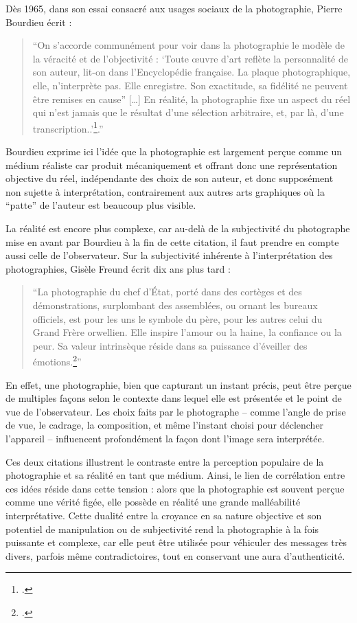 Dès 1965, dans son essai consacré aux usages sociaux de la photographie, Pierre Bourdieu écrit :
\begin{quotation}
	\enquote{On s’accorde communément pour voir dans la photographie le modèle de la véracité et de l’objectivité : \enquote{Toute \oe{}uvre d’art reflète la personnalité de son auteur, lit-on dans l’Encyclopédie française. La plaque photographique, elle, n’interprète pas. Elle enregistre. Son exactitude, sa fidélité ne peuvent être remises en cause” […] En réalité, la photographie fixe un aspect du réel qui n’est jamais que le résultat d’une sélection arbitraire, et, par là, d’une transcription..}\footcite[p.108]{bourdieuArtMoyenEssai1965}.}
\end{quotation}

Bourdieu exprime ici l'idée que la photographie est largement perçue comme un médium réaliste car produit mécaniquement et offrant donc une représentation objective du réel, indépendante des choix de son auteur, et donc supposément non sujette à interprétation, contrairement aux autres arts graphiques où la \enquote{patte} de l’auteur est beaucoup plus visible. 

La réalité est encore plus complexe, car au-delà de la subjectivité du photographe mise en avant par Bourdieu à la fin de cette citation, il faut prendre en compte aussi celle de l’observateur. Sur la subjectivité inhérente à l'interprétation des photographies, Gisèle Freund écrit dix ans plus tard :

\begin{quotation}
	\enquote{La photographie du chef d'État, porté dans des cortèges et des démonstrations, surplombant des assemblées, ou ornant les bureaux officiels, est pour les uns le symbole du père, pour les autres celui du Grand Frère orwellien. Elle inspire l'amour ou la haine, la confiance ou la peur. Sa valeur intrinsèque réside dans sa puissance d'éveiller des émotions.\footcite[p.205]{freundPhotographieSociete2006}}
\end{quotation}

En effet, une photographie, bien que capturant un instant précis, peut être perçue de multiples façons selon le contexte dans lequel elle est présentée et le point de vue de l'observateur. Les choix faits par le photographe -- comme l'angle de prise de vue, le cadrage, la composition, et même l'instant choisi pour déclencher l'appareil -- influencent profondément la façon dont l'image sera interprétée.

Ces deux citations illustrent le contraste entre la perception populaire de la photographie et sa réalité en tant que médium. Ainsi, le lien de corrélation entre ces idées réside dans cette tension : alors que la photographie est souvent perçue comme une vérité figée, elle possède en réalité une grande malléabilité interprétative. Cette dualité entre la croyance en sa nature objective et son potentiel de manipulation ou de subjectivité rend la photographie à la fois puissante et complexe, car elle peut être utilisée pour véhiculer des messages très divers, parfois même contradictoires, tout en conservant une aura d'authenticité.

